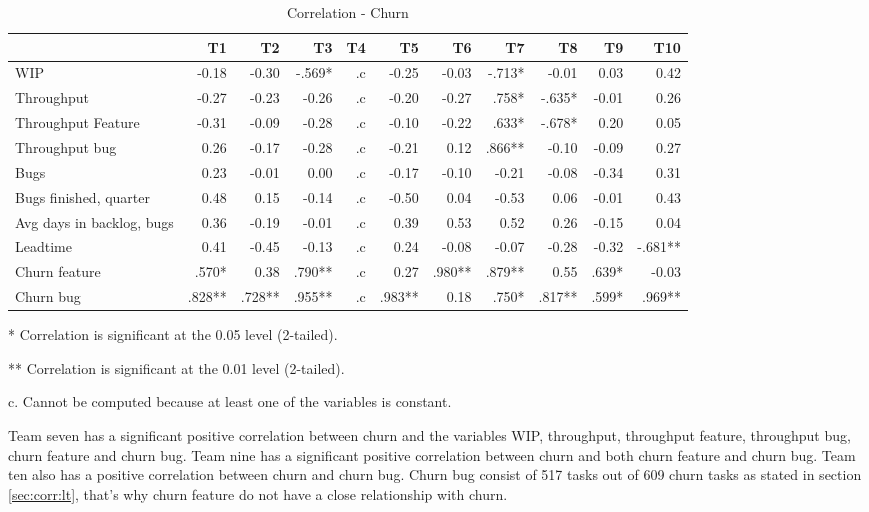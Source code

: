 \documentclass[UKenglish]{ifimaster}  %
\begin{document}
\begin{table}[!htbp]
 \begin{adjustwidth}{-2.5cm}{}

 \centering
 \begin{tabular}{|l|r|r|r|r|r|r|r|r|r|r|}
\hline
 & T1 & T2 & T3 & T4 & T5 & T6 & T7 & T8 & T9 & T10\\ \hline
WIP &-0.18& -0.30& -.569*& .c& -0.25& -0.03& -.713*& -0.01& 0.03& 0.42\\ \hline
Throughput &-0.27& -0.23& -0.26& .c& -0.20& -0.27& .758*& -.635*& -0.01& 0.26\\ \hline
Throughput Feature &-0.31& -0.09& -0.28& .c& -0.10& -0.22& .633*& -.678*& 0.20& 0.05\\ \hline
Throughput bug &0.26& -0.17& -0.28& .c& -0.21& 0.12& .866**& -0.10& -0.09& 0.27\\ \hline
Bugs &0.23& -0.01& 0.00& .c& -0.17& -0.10& -0.21& -0.08& -0.34& 0.31\\ \hline
Bugs finished, quarter &0.48& 0.15& -0.14& .c& -0.50& 0.04& -0.53& 0.06& -0.01& 0.43\\ \hline
Avg days in backlog, bugs &0.36& -0.19& -0.01& .c& 0.39& 0.53& 0.52& 0.26& -0.15& 0.04\\ \hline
Leadtime &0.41& -0.45& -0.13& .c& 0.24& -0.08& -0.07& -0.28& -0.32& -.681**\\ \hline
Churn feature &.570*& 0.38& .790**& .c& 0.27& .980**& .879**& 0.55& .639*& -0.03\\ \hline
Churn bug &.828**
& .728**
& .955**
& .c& .983**
& 0.18& .750*
& .817**
& .599*
& .969**
\\ \hline
\end{tabular}
 \caption{Correlation - Churn}
 \label{corr:churn}
 \centerline {* Correlation is significant at the 0.05 level (2-tailed).}
\centerline{** Correlation is significant at the 0.01 level (2-tailed).}
\centerline{c. Cannot be computed because at least one of the variables is constant.}
\end{adjustwidth}
\end{table}
 Team seven has a significant positive correlation between churn and the variables WIP, throughput, throughput feature, throughput bug, churn feature and churn bug. 
Team nine has a significant positive correlation between churn and both churn feature and churn bug. Team ten also has a positive correlation between churn and churn bug. Churn bug consist of 517 tasks out of 609 churn tasks as stated in section \ref{sec:corr:lt}, that's why churn feature do not have a close relationship with churn.  
\end{document}
